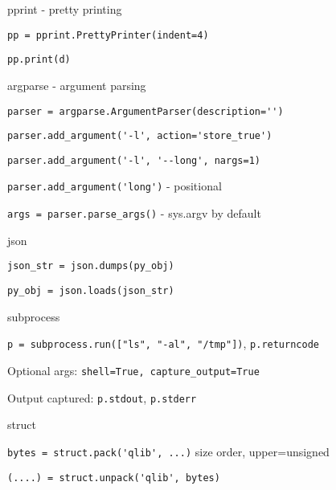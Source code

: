 \documentclass[10pt,a4paper]{article}
\begin{document}
\begin{multicols*}{3}
\noindent pprint - pretty printing
\begin{compactitem}
    \item \verb|pp = pprint.PrettyPrinter(indent=4)|
    \item \verb|pp.print(d)|
\end{compactitem}

\noindent argparse - argument parsing
\begin{compactitem}
    \item \verb|parser = argparse.ArgumentParser(description='')|
    \item \verb|parser.add_argument('-l', action='store_true')|
    \item \verb|parser.add_argument('-l', '--long', nargs=1)|
    \item \verb|parser.add_argument('long')| - positional
    \item \verb|args = parser.parse_args()| - sys.argv by default
\end{compactitem}

\noindent json
\begin{compactitem}
    \item \verb|json_str = json.dumps(py_obj)|
    \item \verb|py_obj = json.loads(json_str)|
\end{compactitem}

\noindent subprocess
\begin{compactitem}
    \item \verb|p = subprocess.run(["ls", "-al", "/tmp"])|, \verb|p.returncode|
    \item Optional args: \verb|shell=True, capture_output=True|
    \item Output captured: \verb|p.stdout|, \verb|p.stderr|
\end{compactitem}

\noindent struct
\begin{compactitem}
    \item \verb|bytes = struct.pack('qlib', ...)| size order, upper=unsigned
    \item \verb|(....) = struct.unpack('qlib', bytes)|
\end{compactitem}

\end{multicols*}
\end{document}
